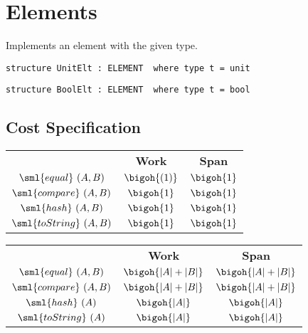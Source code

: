 \chapter{Elements}
\label{ch:elt-structures}

\begin{cluster}
\label{grp:prmbl:elt-structures::implements}

\begin{preamble}
\label{prmbl:elt-structures::implements}
Implements an element with the given type.

\begin{verbatim}
structure UnitElt : ELEMENT  where type t = unit
\end{verbatim}

\begin{verbatim}
structure BoolElt : ELEMENT  where type t = bool
\end{verbatim}

\end{preamble}
\end{cluster}


\section{Cost Specification}
\label{sec:elt-structures::cost-specification}

\begin{cluster}
\label{grp:cost:unit}

\begin{costspec}[UnitElt]
\label{cost:unit}
\begin{tabular}{c|c|c}
& \textbf{Work} & \textbf{Span} \\
$\sml{equal}~(A,B)$ & $\bigoh {(1)}$ & $\bigoh {1}$ \\
$\sml{compare}~(A,B)$ & $\bigoh {1}$ & $\bigoh {1}$ \\
$\sml{hash}~(A,B)$ & $\bigoh {1}$ & $\bigoh {1}$ \\
$\sml{toString}~(A,B)$ & $\bigoh {1}$ & $\bigoh {1}$ \\
\end{tabular}

\end{costspec}
\end{cluster}

\begin{cluster}
\label{grp:cost:string}

\begin{costspec}[StringElt]
\label{cost:string}
\begin{tabular}{c|c|c}
& \textbf{Work} & \textbf{Span} \\
$\sml{equal}~(A,B)$ & $\bigoh{|A| + |B|}$ & $\bigoh {|A| + |B|}$ \\
$\sml{compare}~(A,B)$ & $\bigoh {|A| + |B|}$ & $\bigoh {|A| + |B|}$ \\
$\sml{hash}~(A)$ & $\bigoh {|A|}$ & $\bigoh {|A|}$ \\
$\sml{toString}~(A)$ & $\bigoh {|A|}$ & $\bigoh {|A|}$ \\
\end{tabular}

\end{costspec}
\end{cluster}

